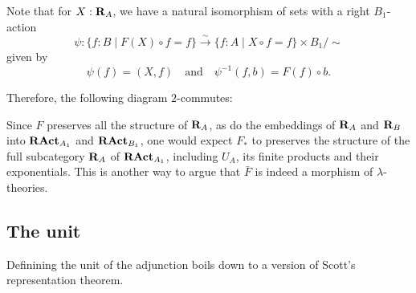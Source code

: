 \begin{remark}
  Note that for $ X : \mathbf{R}_A $, we have a natural isomorphism of sets with a right $ B_1 $-action
  \[ \psi: \{ f : B \mid F(X) \circ f = f \} \xrightarrow \sim \{ f : A \mid X \circ f = f \} \times B_1 / \sim \]
  given by
  \[ \psi(f) = (X, f) \quad \text{and} \quad \psi^{-1}(f, b) = F(f) \circ b. \]

  Therefore, the following diagram $ 2 $-commutes:
  \begin{center}
  \end{center}
  Since $ F $ preserves all the structure of $ \mathbf{R}_A $, as do the embeddings of $ \mathbf{R}_A $ and $ \mathbf{R}_B $ into $ \mathbf{RAct}_{A_1} $ and $ \mathbf{RAct}_{B_1} $, one would expect $ F_* $ to preserves the structure of the full subcategory $ \mathbf{R}_A $ of $ \mathbf{RAct}_{A_1} $, including $ U_A $, its finite products and their exponentials. This is another way to argue that $ \bar F $ is indeed a morphism of $ \lambda $-theories.
\end{remark}

\subsection{The unit}

Definining the unit of the adjunction boils down to a version of Scott's representation theorem.

